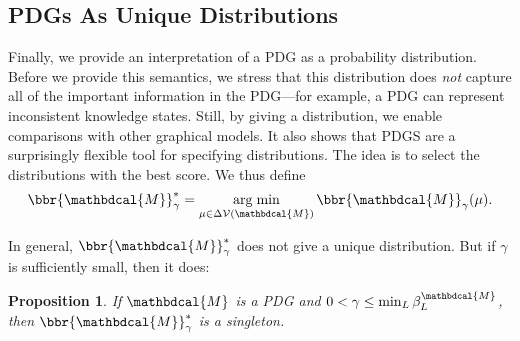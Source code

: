 \documentclass{article}
\theoremstyle{plain}
\newtheorem{prop}[theorem]{Proposition}
\theoremstyle{definition}
\theoremstyle{remark}
\DeclareMathOperator*{\argmin}{arg\;min}
\newcommand{\V}{\mathcal V}
\newcommand{\dg}[1]{\mathbdcal{#1}}
\numberwithin{equation}{section}
\begin{document}
    \subsection{PDGs As Unique Distributions}\label{sec:uniq-dist-semantics}

    Finally, we provide an interpretation of a PDG as a probability distribution.  
    Before we provide this semantics, we stress that
    this distribution does \emph{not} capture all of the important
    information in the PDG---for example, a PDG
    can represent inconsistent knowledge states. 
Still, by giving a distribution, we enable comparisons with other graphical models. 
It also 
 shows that PDGS are 
a surprisingly flexible tool for specifying distributions. 
The idea is to select the distributions with the best score.
We thus define 
\begin{equation}
\bbr{\dg M}_\gamma^* = \argmin_{\mu \in
				   \Delta\V(\dg M)} \bbr{\dg M}_\gamma(\mu).
\end{equation}   

In general, $\bbr{\dg M}_\gamma^*$ does not give a unique
distribution.  But if $\gamma$ is sufficiently small, then it does:
\begin{prop}\label{prop:sem3}
If $\dg M$ is a PDG and $0 < \gamma \leq \min_L \beta_L^{\dg M}$, then $\bbr{\dg
M}_\gamma^*$ is a singleton. 
\end{prop}
\end{document}
